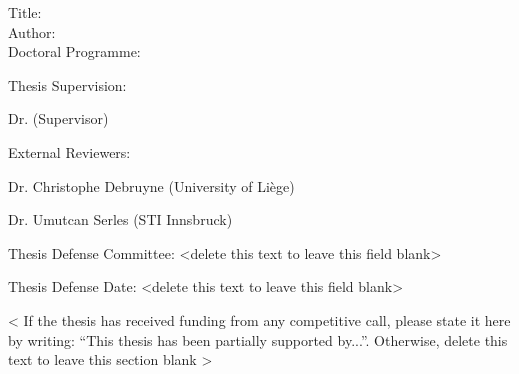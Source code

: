 
\begin{spacing}{1.3}
Title: \thesisTitle \\
Author: \thesisAuthor \\
Doctoral Programme:	 \DoctoralProgramme
\end{spacing}
Thesis Supervision: 
\begin{mydescription}
    \item Dr. \supervisorDetails  (Supervisor)
\end{mydescription}

\vspace{10 mm}
External Reviewers: 
\begin{mydescription}
    \item Dr. Christophe Debruyne (University of Liège)
    \item Dr. Umutcan Serles (STI Innsbruck)
\end{mydescription}

\vspace{10 mm}

Thesis Defense Committee: <delete this text to leave this field blank>


\vspace{50mm}



Thesis Defense Date: <delete this text to leave this field blank>



\vspace{\fill}
\begin{spacing}{1.0}
< If the thesis has received funding from any competitive call, please state it here by writing: “This thesis has been partially supported by...”. Otherwise, delete this text to leave this section blank >
\end{spacing}

